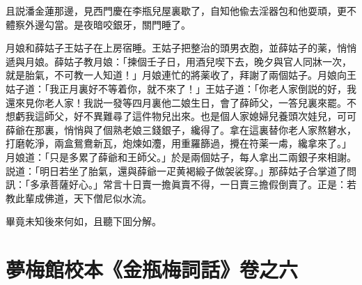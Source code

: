且説潘金蓮那邊，見西門慶在李瓶兒屋裏歇了，自知他偸去淫器包和他耍頑，更不體察外邊勾當。是夜暗咬銀牙，關門睡了。

月娘和薛姑子王姑子在上房宿睡。王姑子把整治的頭男衣胞，並薛姑子的薬，悄悄遞與月娘。薛姑子教月娘：「揀個壬子日，用酒兒喫下去，晚夕與官人同牀一次，就是胎氣，不可教一人知道！」月娘連忙的將薬收了，拜謝了兩個姑子。月娘向王姑子道：「我正月裏好不等着你，就不來了！」王姑子道：「你老人家倒説的好，我還來見你老人家！我説一發等四月裏他二娘生日，會了薛師父，一答兒裏來罷。不想虧我這師父，好不異難尋了這件物兒出來。也是個人家媳婦兒養頭次娃兒，可可薛爺在那裏，悄悄與了個熟老娘三錢銀子，纔得了。拿在這裏替你老人家熬礬水，打磨乾淨，兩盒鴛鴦新瓦，炮煉如灋，用重羅篩過，攪在符薬一䖏，纔拿來了。」月娘道：「只是多累了薛爺和王師父。」於是兩個姑子，每人拿出二兩銀子來相謝。説道：「明日若坐了胎氣，還與薛爺一疋黄褐緞子做袈裟穿。」那薛姑子合掌道了問訊：「多承菩薩好心。」常言十日賣一擔眞賣不得，一日賣三擔假倒賣了。正是：若教此輩成佛道，天下僧尼似水流。

畢竟未知後來何如，且聽下囬分解。

\part*{夢梅館校本《金瓶梅詞話》卷之六}

